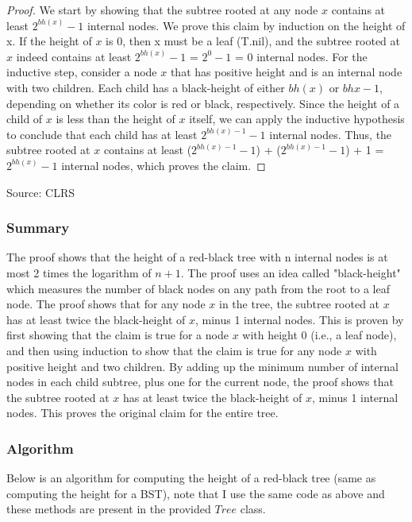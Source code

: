 \documentclass[10pt]{article}
\begin{document}
  \begin{proof}
    We start by showing that the subtree rooted at any node $x$ contains at least
    $2^{bh(x)}- 1$ internal nodes. We prove this claim by induction on the
    height of x. If the height of $x$ is 0, then x must be a leaf (T.nil), and the
    subtree rooted at $x$ indeed contains at least $2^{bh(x)}- 1$ = $2^{0}- 1$ =
    0 internal nodes. For the inductive step, consider a node $x$ that has positive
    height and is an internal node with two children. Each child has a black-height
    of either $bh(x)$ or $bhx - 1$, depending on whether its color is red or black,
    respectively. Since the height of a child of $x$ is less than the height of $x$
    itself, we can apply the inductive hypothesis to conclude that each child
    has at least $2^{bh(x) - 1}- 1$ internal nodes. Thus, the subtree rooted at
    $x$ contains at least ($2^{bh(x) - 1}- 1$) + ($2^{bh(x) - 1}- 1$) + 1 =
    $2^{bh(x)}- 1$ internal nodes, which proves the claim.
  \end{proof}

  \noindent
  Source: CLRS

  \subsubsection*{Summary}


  The proof shows that the height of a red-black tree with n internal nodes is
  at most 2 times the logarithm of $n+1$. The proof uses an idea called "black-height"
  which measures the number of black nodes on any path from the root to a leaf node.
  The proof shows that for any node $x$ in the tree, the subtree rooted at $x$ has
  at least twice the black-height of $x$, minus 1 internal nodes. This is proven
  by first showing that the claim is true for a node $x$ with height 0 (i.e., a
  leaf node), and then using induction to show that the claim is true for any
  node $x$ with positive height and two children. By adding up the minimum number
  of internal nodes in each child subtree, plus one for the current node, the proof
  shows that the subtree rooted at $x$ has at least twice the black-height of $x$,
  minus 1 internal nodes. This proves the original claim for the entire tree.

  \subsubsection*{Algorithm}


  Below is an algorithm for computing the height of a red-black tree (same as
  computing the height for a BST), note that I use the same code as above and
  these methods are present in the provided $Tree$ class.
\end{document}

